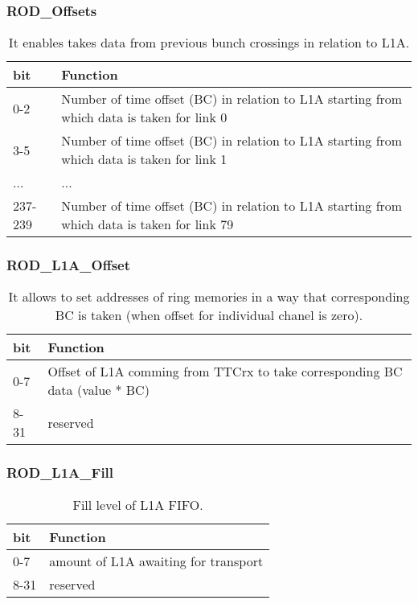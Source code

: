 \subsubsection{ROD\_Offsets}
\begin {table}[H]
\begin{center}
\begin{tabular}{|l|l|}
\hline
\textbf{bit} & \textbf{Function} \\
\hline
0-2 & Number of time offset (BC) in relation to L1A starting from which data is taken for link 0 \\ \hline
3-5 & Number of time offset (BC) in relation to L1A starting from which data is taken for link 1 \\ \hline
... & ...\\ \hline
237-239 & Number of time offset (BC) in relation to L1A starting from which data is taken for link 79 \\ \hline
\end{tabular}
\caption{It enables takes data from previous bunch crossings in relation to L1A.}
\end{center}
\end{table}

\subsubsection{ROD\_L1A\_Offset}
\begin {table}[H]
\begin{center}
\begin{tabular}{|l|l|}
\hline
\textbf{bit} & \textbf{Function} \\
\hline
0-7 & Offset of L1A comming from TTCrx to take corresponding BC data (value * BC) \\ \hline
8-31 & reserved \\ \hline
\end{tabular}
\caption{It allows to set addresses of ring memories in a way that corresponding BC is taken (when offset for individual chanel is zero).}
\end{center}
\end{table}

\subsubsection{ROD\_L1A\_Fill}
\begin {table}[H]
\begin{center}
\begin{tabular}{|l|l|}
\hline
\textbf{bit} & \textbf{Function} \\
\hline
0-7 & amount of L1A awaiting for transport \\ \hline
8-31 & reserved \\ \hline
\end{tabular}
\caption{Fill level of L1A FIFO.}
\end{center}
\end{table}

